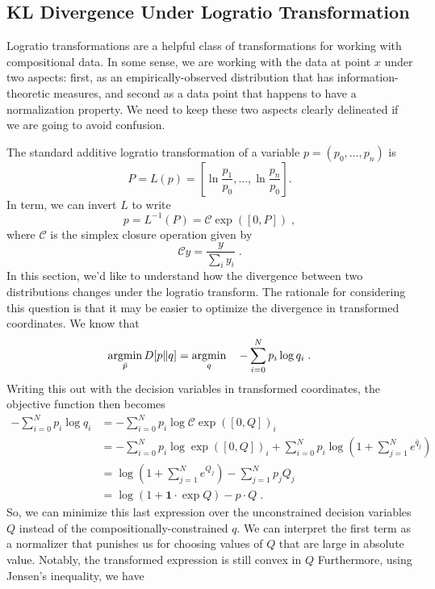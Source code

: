 \documentclass[english]{scrartcl}
\newcommand{\argmin}{\operatornamewithlimits{argmin}}
\begin{document}
	\subsection{KL Divergence Under Logratio Transformation}
		Logratio transformations are a helpful class of transformations for working with compositional data. In some sense, we are working with the data at point $x$ under two aspects: first, as an empirically-observed distribution that has information-theoretic measures, and second as a data point that happens to have a normalization property. We need to keep these two aspects clearly delineated if we are going to avoid confusion.

		The standard additive logratio transformation of a variable $p = (p_0, \ldots,p_n)$ is
		\begin{equation}
			P = L(p) = \left[\ln \frac{p_1}{p_0},\ldots, \ln \frac{p_n}{p_0}\right].
		\end{equation}
		In term, we can invert $L$ to write
		\begin{equation}
			p = L^{-1}(P) = \mathcal{C}\exp([0,P])\;,
		\end{equation}
		where $\mathcal{C}$ is the simplex closure operation given by
		\begin{equation}
			\mathcal{C}y = \frac{y}{\sum_i y_i}\;.
		\end{equation}
		In this section, we'd like to understand how the divergence between two distributions changes under the logratio transform. The rationale for considering this question is that it may be easier to optimize the divergence in transformed coordinates.
		We know that
		\begin{equation}
			\argmin_{\bar{p}} D[p\|q] = \argmin_{q} \quad - \sum_{i=0}^N p_i \log q_i\;.
		\end{equation}
		Writing this out with the decision variables in transformed coordinates, the objective function then becomes
		\begin{align}
			- \sum_{i=0}^N p_i \log q_i &= - \sum_{i=0}^N p_i \log \mathcal{C} \exp([0,Q])_i \\
			&= - \sum_{i=0}^N p_i \log  \exp([0,Q])_i + \sum_{i=0}^N p_i \log \left(1 + \sum_{j = 1}^N e^{\bar{q}_j}\right) \\
			&= \log \left(1 + \sum_{j = 1}^N e^{Q_j}\right) - \sum_{j=1}^N p_j Q_j \\
			&= \log (1 + \mathbf{1} \cdot \exp Q) - p\cdot Q\;.
		\end{align}
		So, we can minimize this last expression over the unconstrained decision variables $Q$ instead of the compositionally-constrained $q$. We can interpret the first term as a normalizer that punishes us for choosing values of $Q$ that are large in absolute value. Notably, the transformed expression is still convex in $Q$ Furthermore, using Jensen's inequality, we have
\end{document}
